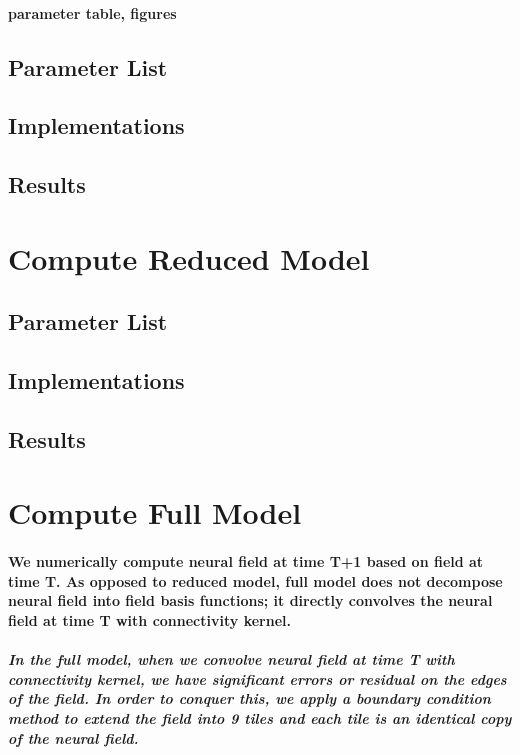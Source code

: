 \documentclass[a4paper, 12pt, english]{article}
\begin{document}
\paragraph{parameter table, figures}
\subsection{Parameter List}
\subsection{Implementations}
\subsection{Results}
\newpage





\section{Compute Reduced Model}
\subsection{Parameter List}
\subsection{Implementations}
\subsection{Results}

\newpage





\section{Compute Full Model}
\paragraph{We numerically compute neural field at time T+1 based on field at time T.
As opposed to reduced model, full model does not decompose neural field into field basis functions; it directly convolves
the neural field at time T with connectivity kernel.}

\subparagraph{In the full model, when we convolve neural field at time T with connectivity kernel,
we have significant errors or residual on the edges of the field. In order to conquer this,
we apply a boundary condition method to extend the field into 9 tiles and each tile is an identical copy
of the neural field.}
\end{document}
